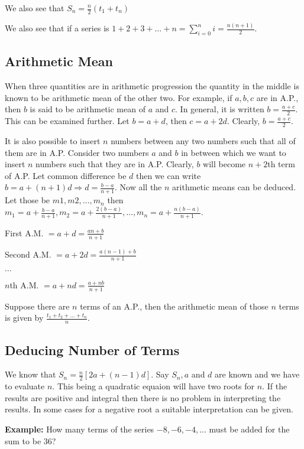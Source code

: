We also see that $S_n = \frac{n}{2}(t_1 + t_n)$

We also see that if a series is $\displaystyle 1 + 2 + 3 + \ldots + n = \sum_{i=0}^ni = \frac{n(n + 1)}{2}$.

\subsection{Arithmetic Mean}
When three quantities are in arithmetic progression the quantity in the middle is known to be arithmetic mean of the other two. For
example, if $a, b, c$ are in A.P., then $b$ is said to be arithmetic mean of $a$ and $c$. In general, it is written $b = \frac{a +
  c}{2}$. This can be examined further. Let $b = a + d$, then $c = a + 2d$. Clearly, $b = \frac{a + c}{2}$.

It is also possible to insert $n$ numbers between any two numbers such that all of them are in A.P. Consider two numbers $a$ and
$b$ in between which we want to insert $n$ numbers such that they are in A.P. Clearly, $b$ will become $n +2$th term of A.P. Let
common difference be $d$ then we can write $b = a + (n + 1)d \Rightarrow d = \frac{b - a}{n + 1}$. Now all the $n$ arithmetic means
can be deduced. Let those be $m1, m2, \ldots, m_n$ then $m_1 = a + \frac{b - a}{n + 1}, m_2 = a + \frac{2(b - a)}{n + 1}, \ldots,
m_n = a + \frac{n(b - a)}{n + 1}$.

First A.M. $= a + d = \frac{an + b}{n +1}$

Second A.M. $= a + 2d = \frac{a(n - 1) + b}{n + 1}$

$\ldots$

$n$th A.M. $= a + nd = \frac{a + nb}{n + 1}$

Suppose there are $n$ terms of an A.P., then the arithmetic mean of those $n$ terms is given by $\frac{t_1 + t_2 + \ldots +
  t_n}{n}$.

\subsection{Deducing Number of Terms}
We know that $S_n = \frac{n}{2}[2a + (n - 1)d]$. Say $S_n, a$ and $d$ are known and we have to evaluate $n$. This being a quadratic
equaion will have two roots for $n$. If the results are positive and integral then there is no problem in interpreting the
results. In some cases for a negative root a suitable interpretation can be given.

{\bf Example:} How many terms of the series $-8, -6, -4, \ldots$ must be added for the sum to be $36$?

